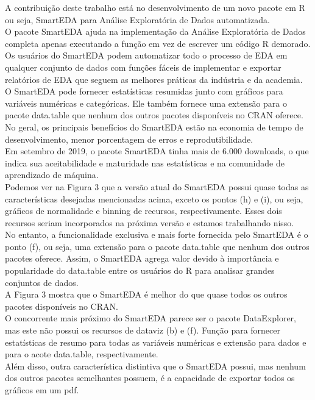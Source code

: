 \documentclass[
]{article}
\begin{document}
A contribuição deste trabalho está no desenvolvimento de um novo pacote
em R ou seja, SmartEDA para Análise Exploratória de Dados
automatizada.\\
O pacote SmartEDA ajuda na implementação da Análise Exploratória de
Dados completa apenas executando a função em vez de escrever um código R
demorado. Os usuários do SmartEDA podem automatizar todo o processo de
EDA em qualquer conjunto de dados com funções fáceis de implementar e
exportar relatórios de EDA que seguem as melhores práticas da indústria
e da academia.\\
O SmartEDA pode fornecer estatísticas resumidas junto com gráficos para
variáveis numéricas e categóricas. Ele também fornece uma extensão para
o pacote data.table que nenhum dos outros pacotes disponíveis no CRAN
oferece.\\
No geral, os principais benefícios do SmartEDA estão na economia de
tempo de desenvolvimento, menor porcentagem de erros e
reprodutibilidade.\\
Em setembro de 2019, o pacote SmartEDA tinha mais de 6.000 downloads, o
que indica sua aceitabilidade e maturidade nas estatísticas e na
comunidade de aprendizado de máquina.\\
Podemos ver na Figura 3 que a versão atual do SmartEDA possui quase
todas as características desejadas mencionadas acima, exceto os pontos
(h) e (i), ou seja, gráficos de normalidade e binning de recursos,
respectivamente. Esses dois recursos seriam incorporados na próxima
versão e estamos trabalhando nisso.\\
No entanto, a funcionalidade exclusiva e mais forte fornecida pelo
SmartEDA é o ponto (f), ou seja, uma extensão para o pacote data.table
que nenhum dos outros pacotes oferece. Assim, o SmartEDA agrega valor
devido à importância e popularidade do data.table entre os usuários do R
para analisar grandes conjuntos de dados.\\
A Figura 3 mostra que o SmartEDA é melhor do que quase todos os outros
pacotes disponíveis no CRAN.\\
O concorrente mais próximo do SmartEDA parece ser o pacote DataExplorer,
mas este não possui os recursos de dataviz (b) e (f). Função para
fornecer estatísticas de resumo para todas as variáveis numéricas e
extensão para dados e para o acote data.table, respectivamente.\\
Além disso, outra característica distintiva que o SmartEDA possui, mas
nenhum dos outros pacotes semelhantes possuem, é a capacidade de
exportar todos os gráficos em um pdf.
\end{document}
